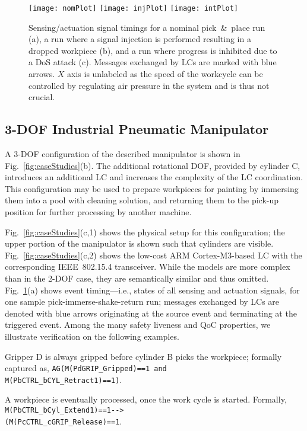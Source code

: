 \begin{figure}[t]
	\texttt{[image: nomPlot]}\vspace{5pt}
	\texttt{[image: injPlot]}\vspace{5pt}
	\texttt{[image: intPlot]}
	\caption{Sensing/actuation signal timings for a nominal pick~\&~place run (a), a run where a signal injection is performed resulting in a dropped workpiece (b), and a run where progress is inhibited due to a DoS attack (c). Messages exchanged by LCs are marked with blue arrows. $X$ axis is unlabeled as the speed of the workcycle can be controlled by regulating air pressure in the system and is thus not crucial.}
	\label{fig:plots}
\end{figure}


\subsection{3-DOF Industrial Pneumatic Manipulator}
A 3-DOF configuration of the described manipulator is shown in Fig.~\ref{fig:caseStudies}(b). The additional rotational DOF, provided by cylinder C, introduces an additional LC and increases the complexity of the LC coordination. This configuration may be used to prepare workpieces for painting by immersing them into a pool with cleaning solution, and returning them to the pick-up position for further processing by another machine.

Fig.~\ref{fig:caseStudies}(c,1) shows the physical setup for  this configuration; the upper portion of the manipulator is shown such that cylinders are visible. Fig.~\ref{fig:caseStudies}(c,2) shows the low-cost ARM Cortex-M3-based LC with the corresponding IEEE~802.15.4 transceiver. While the models are more complex than in the 2-DOF case, they are semantically similar and thus omitted. Fig.~\ref{fig:plots}(a) shows event timing---i.e., states of all sensing and actuation signals, for one sample pick-immerse-shake-return run; messages exchanged by LCs are denoted with blue arrows originating at the source event and terminating at the triggered event. Among the many safety liveness and QoC properties, we illustrate verification on the following examples.
%
\begin{property}\label{prop:caseStudyP1}
Gripper D is always gripped before cylinder B picks the workpiece; formally captured as, \verb!AG(M(PdGRIP_Gripped)==1 and!\\\verb!M(PbCTRL_bCYL_Retract1)==1)!.
\end{property}
%
\begin{property}\label{prop:caseStudyP2}
A workpiece is eventually processed, once the work cycle is started. Formally, \verb!M(PbCTRL_bCyl_Extend1)==1-->!\\\verb!(M(PcCTRL_cGRIP_Release)==1!.
\end{property}
%

